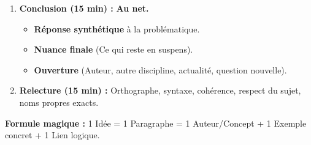 \documentclass[11pt]{article}
\newcommand{\cle}[1]{{\popxbold\color{popdark}#1}}
\begin{document}
\begin{methode}
\begin{enumerate}
\begin{itemize}
    \end{itemize}
    \item \textbf{Conclusion (15 min) :} \textbf{Au net.}
    \begin{itemize}
        \item \textbf{Réponse synthétique} à la problématique.
        \item \textbf{Nuance finale} (Ce qui reste en suspens).
        \item \textbf{Ouverture} (Auteur, autre discipline, actualité, question nouvelle).
    \end{itemize}
    \item \textbf{Relecture (15 min) :} Orthographe, syntaxe, cohérence, respect du sujet, noms propres exacts.
\end{enumerate}
\textbf{Formule magique :} \cle{1 Idée = 1 Paragraphe = 1 Auteur/Concept + 1 Exemple concret + 1 Lien logique}.
\end{methode}
\end{document}
